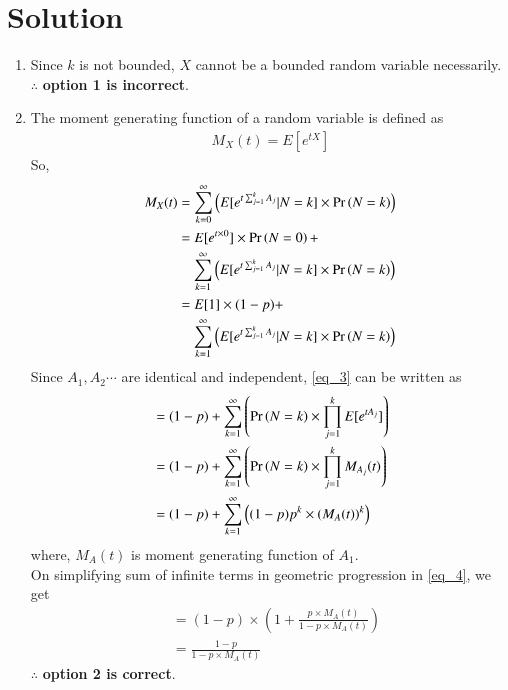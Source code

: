 \documentclass[journal,12pt,twocolumn]{IEEEtran}
\begin{document}
\section{Solution}
\begin{enumerate}
    \item Since $k$ is not bounded, $X$ cannot be a bounded random variable necessarily.\\
$\therefore$ \textbf{option 1 is incorrect}.\\
\item The moment generating function of a random variable is defined as
\begin{align}
    M_X(t)=E[e^{tX}]
\end{align}
So,
\begin{align}
    M_X(t)&=\sum_{k=0}^{\infty}\left(E[e^{t\sum_{j=1}^{k} A_j}
    |N=k]\times \pr{N=k}\right)\\
    &\begin{multlined}
    =E[e^{t\times 0}]\times \pr{N=0}+\\
    \sum_{k=1}^{\infty}\left(E[e^{t\sum_{j=1}^{k} A_j}
    |N=k]\times \pr{N=k}\right)
    \end{multlined}\\
    &\begin{multlined}
    =E[1]\times (1-p)+\\
    \sum_{k=1}^{\infty}\left(E[e^{t\sum_{j=1}^{k} A_j}|N=k]\times \pr{N=k}\right) \label{eq_3}
    \end{multlined}
\end{align}
Since $A_1,A_2\cdots$ are identical and independent, \eqref{eq_3} can be written as
\begin{align}
    &=(1-p)+\sum_{k=1}^{\infty}\left(\Pr\left(N=k\right)\times\prod_{j=1}^k E[e^{tA_j}]\right) \\
    &=(1-p)+\sum_{k=1}^{\infty}\left(\Pr\left(N=k\right)\times\prod_{j=1}^k M_{A_j}(t)\right) \\
   & =(1-p)+\sum_{k=1}^{\infty}\left((1-p)p^k\times(M_{A}(t))^k\right)\;\label{eq_4}
\end{align}
where, $M_{A}(t)$ is moment generating function of $A_1$.\\
On simplifying sum of infinite terms in geometric progression in \eqref{eq_4}, we get
\begin{align}
    &=(1-p)\times \left(1+\frac{p\times M_A(t)}{1-p\times M_A(t)}\right)\\
    &=\frac{1-p}{1-p\times M_A(t) }
\end{align}
$\therefore$ \textbf{option 2 is correct}.\\


\end{enumerate}
\end{document}
